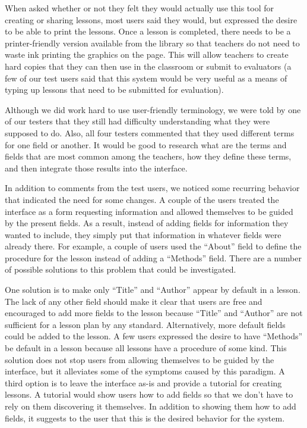 \documentclass[10pt,letter,titlepage]{article}
\begin{document}
When asked whether or not they felt they would actually use this tool for
creating or sharing lessons, most users said they would, but expressed the
desire to be able to print the lessons. Once a lesson is completed, there needs
to be a printer-friendly version available from the library so that teachers do
not need to waste ink printing the graphics on the page. This will allow
teachers to create hard copies that they can then use in the classroom or submit
to evaluators (a few of our test users said that this system would be very
useful as a means of typing up lessons that need to be submitted for evaluation).

Although we did work hard to use user-friendly terminology, we were told by
one of our testers that they still had difficulty understanding what they were
supposed to do.  Also, all four testers commented that they used different
terms for one field or another.  It would be good to research what are the
terms and fields that are most common among the teachers, how they define these
terms, and then integrate those results into the interface.

In addition to comments from the test users, we noticed some recurring behavior
that indicated the need for some changes. A couple of the users treated the
interface as a form requesting information and allowed themselves to be guided
by the present fields. As a result, instead of adding fields for information
they wanted to include, they simply put that information in whatever fields were
already there. For example, a couple of users used the ``About'' field to define
the procedure for the lesson instead of adding a ``Methods'' field. There are a
number of possible solutions to this problem that could be investigated.

One solution is to make only ``Title'' and ``Author'' appear by default in a
lesson.  The lack of any other field should make it clear that users are free
and encouraged to add more fields to the lesson because ``Title'' and ``Author''
are not sufficient for a lesson plan by any standard. Alternatively, more
default fields could be added to the lesson. A few users expressed the desire to
have ``Methods'' be default in a lesson because all lessons have a procedure of
some kind. This solution does not stop users from allowing themselves to be
guided by the interface, but it alleviates some of the symptoms caused by this
paradigm. A third option is to leave the interface as-is and provide a tutorial
for creating lessons. A tutorial would show users how to add fields so that we
don't have to rely on them discovering it themselves. In addition to showing
them how to add fields, it suggests to the user that this is the desired
behavior for the system.
\end{document}
